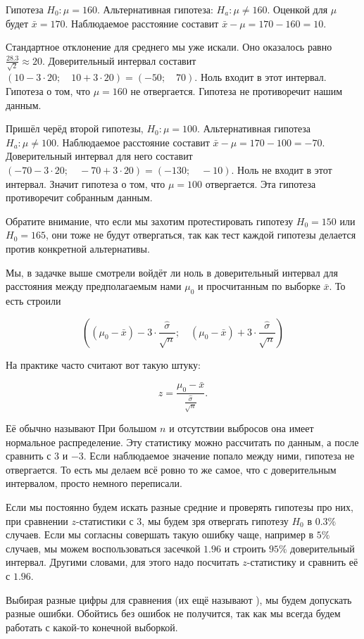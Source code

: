 \documentclass[12pt, a4paper, oneside]{article}
\begin{document}
\begin{sol}
Гипотеза $H_0:  \mu = 160.$  Альтернативная гипотеза: $H_a: \mu \ne 160$. Оценкой для $\mu$ будет $\bar x = 170$.  Наблюдаемое расстояние составит $\bar x - \mu = 170 - 160 = 10$. 

Стандартное отклонение для среднего мы уже искали. Оно оказалось равно $\frac{28.3}{\sqrt{2}} \approx 20$. Доверительный интервал составит $(10 - 3 \cdot 20; \quad  10 + 3 \cdot 20) = (-50; \quad  70)$.  Ноль входит в этот интервал. Гипотеза о том, что $\mu = 160$ не отвергается. Гипотеза не противоречит нашим данным.

Пришёл черёд второй гипотезы, $H_0: \mu = 100.$ Альтернативная гипотеза $H_a: \mu \ne 100$. Наблюдаемое расстояние составит $\bar x - \mu = 170 - 100 = -70$.  Доверительный интервал для него составит $(-70 - 3 \cdot 20; \quad -70 + 3 \cdot 20) = (-130; \quad -10)$. Ноль не входит в этот интервал. Значит гипотеза о том, что $\mu = 100$ отвергается. Эта гипотеза противоречит собранным данным.

Обратите внимание, что если мы захотим протестировать гипотезу $H_0 = 150$ или $H_0 = 165$, они тоже не будут отвергаться, так как тест каждой гипотезы делается против конкретной альтернативы. 

Мы, в задачке выше смотрели войдёт ли ноль в доверительный интервал для расстояния между предполагаемым нами $\mu_0$ и просчитанным по выборке $\bar x$. То есть строили 

\[ 
\left((\mu_0 - \bar x) - 3 \cdot \frac{\hat \sigma}{\sqrt{n}}; \quad (\mu_0 - \bar x) + 3 \cdot \frac{\hat \sigma}{\sqrt{n}} \right)
\] 

На практике часто считают вот такую штуку: 

$$
z = \frac{\mu_0 - \bar x}{\frac{\hat \sigma}{\sqrt{n}}}.
$$

Её обычно называют  При большом $n$ и отсутствии выбросов она имеет нормальное распределение.  Эту статистику можно рассчитать по данным, а после сравнить с $3$ и $-3$. Если наблюдаемое значение попало между ними, гипотеза не отвергается. То есть мы делаем всё ровно то же самое, что с доверительным интервалом, просто немного переписали. 

Если мы постоянно будем искать разные средние и проверять гипотезы про них, при сравнении $z$-статистики с $3$, мы будем зря отвергать гипотезу $H_0$ в $0.3\%$ случаев. Если мы согласны совершать такую ошибку чаще, например в $5\%$ случаев, мы можем воспользоваться засечкой $1.96$ и строить $95\%$ доверительный интервал. Другими словами, для этого надо посчитать $z$-статистику и сравнить её с $1.96$. 

Выбирая разные цифры для сравнения (их ещё называют ), мы будем допускать разные ошибки. Обойтись без ошибок не получится, так как мы всегда будем работать с какой-то конечной выборкой. 
\end{sol}
\end{document}

